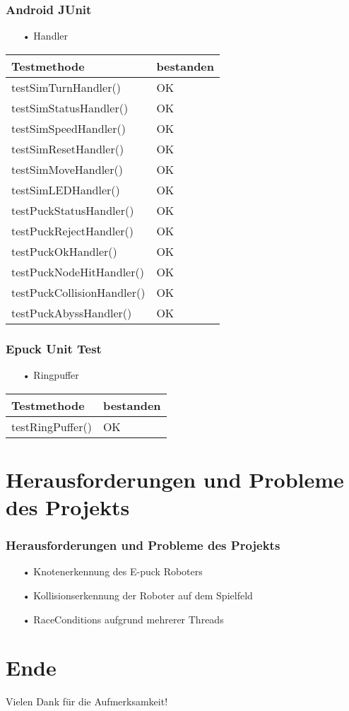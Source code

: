 \documentclass[xcolor=dvipsnames]{beamer}
\begin{document}
	\begin{frame}
	\frametitle{Android JUnit}
		\begin{itemize}
			\item[•]Handler
		\end{itemize}
			\begin{tabular}{l|p{2cm}}
				\hline
					\textbf{Testmethode} & \textbf{bestanden}\\
				\hline \hline
					 testSimTurnHandler() & OK \\
 				\hline
					testSimStatusHandler() & OK \\
				\hline		
					testSimSpeedHandler() & OK \\
				\hline		
					testSimResetHandler() & OK \\
				\hline	
					testSimMoveHandler() & OK \\
				\hline	
					testSimLEDHandler() & OK \\
				\hline	
					testPuckStatusHandler() & OK \\
				\hline	
					testPuckRejectHandler() & OK \\
				\hline	
					testPuckOkHandler() & OK \\
				\hline	
					testPuckNodeHitHandler() & OK \\
				\hline	
					testPuckCollisionHandler() & OK \\
				\hline	
					testPuckAbyssHandler() & OK \\
				\hline
			\end{tabular}
	\end{frame}
	
	\begin{frame}
	\frametitle{Epuck Unit Test}
		\begin{itemize}
			\item[•]Ringpuffer
		\end{itemize}
			\begin{tabular}{l|p{2cm}}
				\hline
					\textbf{Testmethode} & \textbf{bestanden}\\
				\hline \hline
					 testRingPuffer() & OK \\
 				\hline
			\end{tabular}
	\end{frame}

		
\section{Herausforderungen und Probleme des Projekts}
	\begin{frame}
	\frametitle{Herausforderungen und Probleme des Projekts}
		\begin{itemize}
			\item[•]Knotenerkennung des E-puck Roboters
			\item[•]Kollisionserkennung der Roboter auf dem Spielfeld
			\item[•]RaceConditions aufgrund mehrerer Threads
		\end{itemize}
	\end{frame}
		

\section{Ende}
	\begin{frame}
		\begin{center}
			Vielen Dank für die Aufmerksamkeit!
		\end{center}
	\end{frame}
		
\end{document}
